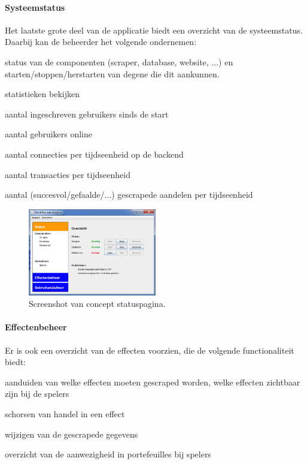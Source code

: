 \paragraph{Systeemstatus}Het laatste grote deel van de applicatie biedt een overzicht van de systeemstatus. Daarbij kan de beheerder het volgende ondernemen:
\begin{itemize_compact}
\item{status van de componenten (scraper, database, website, ...) en starten/stoppen/herstarten van degene die dit aankunnen.}
\item{statistieken bekijken}
	\begin{itemize_compact}
	\item{aantal ingeschreven gebruikers sinds de start}
	\item{aantal gebruikers online}
	\item{aantal connecties per tijdseenheid op de backend}
	\item{aantal transacties per tijdseenheid}
	\item{aantal (succesvol/gefaalde/...) gescrapede aandelen per tijdseenheid}
	\end{itemize_compact}
\end{itemize_compact}

\begin{figure}[h!]
	\centering
		\includegraphics[width=0.5\textwidth]{images/ontwerp/screenshot_app_status}
	\caption{Screenshot van concept statuspagina.}
\end{figure}

\paragraph{Effectenbeheer}Er is ook een overzicht van de effecten voorzien, die de volgende functionaliteit biedt:
\begin{itemize_compact}
	\item{aanduiden van welke effecten moeten gescraped worden, welke effecten zichtbaar zijn bij de spelers}
	\item{schorsen van handel in een effect}
	\item{wijzigen van de gescrapede gegevens}
	\item{overzicht van de aanwezigheid in portefeuilles bij spelers}
\end{itemize_compact}

